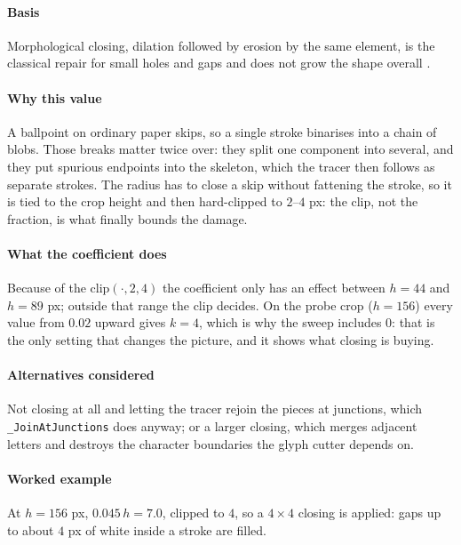 \paragraph{Basis}

Morphological closing, dilation followed by erosion by the same element, is the classical repair for small holes and gaps and does not grow the shape overall \cite{haralick1987}.

\paragraph{Why this value}

A ballpoint on ordinary paper skips, so a single stroke binarises into a chain of blobs. Those breaks matter twice over: they split one component into several, and they put spurious endpoints into the skeleton, which the tracer then follows as separate strokes. The radius has to close a skip without fattening the stroke, so it is tied to the crop height and then hard-clipped to $2$--$4$ px: the clip, not the fraction, is what finally bounds the damage.

\paragraph{What the coefficient does}

Because of the $\mathrm{clip}(\cdot,2,4)$ the coefficient only has an effect between $h=44$ and $h=89$ px; outside that range the clip decides. On the probe crop ($h=156$) every value from $0.02$ upward gives $k=4$, which is why the sweep includes $0$: that is the only setting that changes the picture, and it shows what closing is buying.

\paragraph{Alternatives considered}

Not closing at all and letting the tracer rejoin the pieces at junctions, which \texttt{\_JoinAtJunctions} does anyway; or a larger closing, which merges adjacent letters and destroys the character boundaries the glyph cutter depends on.

\paragraph{Worked example}

At $h=156$ px, $0.045\,h = 7.0$, clipped to $4$, so a $4\times4$ closing is applied: gaps up to about $4$ px of white inside a stroke are filled.

